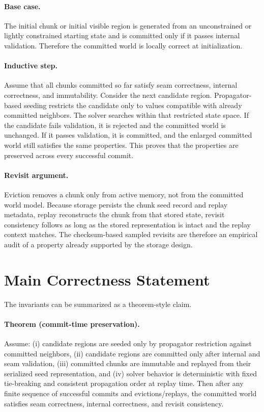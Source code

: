 \documentclass[12pt,a4paper]{report}
\begin{document}
\paragraph{Base case.} The initial chunk or initial visible region is generated from an unconstrained or lightly constrained starting state and is committed only if it passes internal validation. Therefore the committed world is locally correct at initialization.

\paragraph{Inductive step.} Assume that all chunks committed so far satisfy seam correctness, internal correctness, and immutability. Consider the next candidate region. Propagator-based seeding restricts the candidate only to values compatible with already committed neighbors. The solver searches within that restricted state space. If the candidate fails validation, it is rejected and the committed world is unchanged. If it passes validation, it is committed, and the enlarged committed world still satisfies the same properties. This proves that the properties are preserved across every successful commit.

\paragraph{Revisit argument.} Eviction removes a chunk only from active memory, not from the committed world model. Because storage persists the chunk seed record and replay metadata, replay reconstructs the chunk from that stored state, revisit consistency follows as long as the stored representation is intact and the replay context matches. The checksum-based sampled revisits are therefore an empirical audit of a property already supported by the storage design.

\section{Main Correctness Statement}
The invariants can be summarized as a theorem-style claim.

\paragraph{Theorem (commit-time preservation).} Assume: (i) candidate regions are seeded only by propagator restriction against committed neighbors, (ii) candidate regions are committed only after internal and seam validation, (iii) committed chunks are immutable and replayed from their serialized seed representation, and (iv) solver behavior is deterministic with fixed tie-breaking and consistent propagation order at replay time. Then after any finite sequence of successful commits and evictions/replays, the committed world satisfies seam correctness, internal correctness, and revisit consistency.
\end{document}
